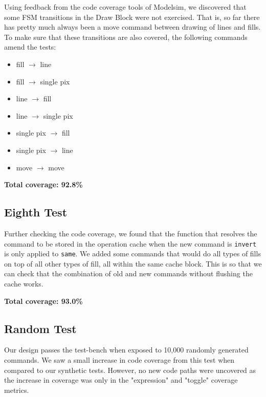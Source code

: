\documentclass[]{article}
\begin{document}
Using feedback from the code coverage tools of Modelsim, we discovered that some FSM transitions in the Draw Block were not exercised. That is, so far there has pretty much always been a move command between drawing of lines and fills. To make sure that these transitions are also covered, the following commands amend the tests:
\begin{itemize}
	\item fill $\rightarrow$ line
	\item fill $\rightarrow$ single pix
	\item line $\rightarrow$ fill
	\item line $\rightarrow$ single pix
	\item single pix $\rightarrow$ fill
	\item single pix $\rightarrow$ line
	\item move $\rightarrow$ move
\end{itemize}

\textbf{Total coverage: 92.8\%}


\subsection{Eighth Test} %
\label{sub:eighth_test}

Further checking the code coverage, we found that the function that resolves the command to be stored in the operation cache when the new command is \verb"invert" is only applied to \verb"same".
We added some commands that would do all types of fills on top of all other types of fill, all within the same cache block. This is so that we can check that the combination of old and new commands without flushing the cache works.

\textbf{Total coverage: 93.0\%}


\subsection{Random Test} %
\label{sub:random_test}

Our design passes the test-bench when exposed to 10,000 randomly generated commands. We saw a small increase in code coverage from this test when compared to our synthetic tests. However, no new code paths were uncovered as the increase in coverage was only in the "expression" and "toggle" coverage metrics.
\end{document}
